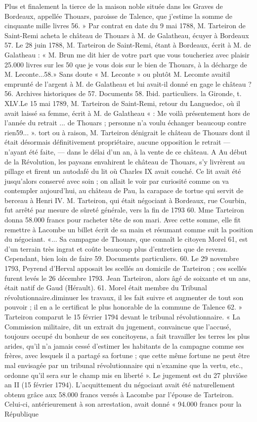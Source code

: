 Plus et finalement la tierce de la maison noble située dans les Graves de Bordeaux, appellée Thouars, paroisse de Talence, que j'estime la somme de cinquante mille livres 56. » Par contrat en date du 9 mai 1788, M. Tarteiron de Saint-Remi acheta le château de Thouars à M. de Galatheau, écuyer à Bordeaux 57. Le 28 juin 1788, M. Tarteiron de Saint-Remi, étant à Bordeaux, écrit à M. de Galatheau : « M. Brun me dit hier de votre part que vous toucheriez avec plaisir 25.000 livres sur les 50 que je vous dois sur le bien de Thouars, à la décharge de M. Leconte...58.» Sans doute « M. Leconte » ou plutôt M. Lecomte avaitil emprunté de l'argent à M. de Galatheau et lui avait-il donné en gage le château ? 56. Archives historiques de 57. Documents 58. Ibid. particuliers. la Gironde, t. XLV.Le 15 mai 1789, M. Tarteiron de Saint-Remi, retour du Languedoc, où il avait laissé sa femme, écrit à M. de Galatheau « : Me voilà présentement hors de l'année du retrait ... de Thouars ; personne n'a voulu échanger beaucoup contre rien59... ». tort ou à raison, M. Tarteiron dénigrait le château de Thouars dont il était désormais définitivement propriétaire, aucune opposition le retrait — n'ayant été faite, — dans le délai d'un an, à la vente de ce château. A Au début de la Révolution, les paysans envahirent le château de Thouars, s'y livrèrent au pillage et firent un autodafé du lit où Charles IX avait couché. Ce lit avait été jusqu'alors conservé avec soin ; on allait le voir par curiosité comme on va contempler aujourd'hui, au château de Pau, la carapace de tortue qui servit de berceau à Henri IV. M. Tarteiron, qui était négociant à Bordeaux, rue Courbin, fut arrêté par mesure de sûreté générale, vers la fin de 1793 60. Mme Tarteiron donna 58.000 francs pour racheter tête de son mari. Avec cette somme, elle fit remettre à Lacombe un billet écrit de sa main et résumant comme suit la position du négociant. «... Sa campagne de Thouars, que connaît le citoyen Morel 61, est d'un terrain très ingrat et coûte beaucoup plus d'entretien que de revenu. Cependant, bien loin de faire 59. Documents particuliers. 60. Le 29 novembre 1793, Peyrend d'Herval apposait les scellés au domicile de Tarteiron ; ces scellés furent levés le 26 décembre 1793. Jean Tarteiron, alors âgé de soixante et un ans, était natif de Gaud (Hérault). 61. Morel était membre du Tribunal révolutionnaire.diminuer les travaux, il les fait suivre et augmenter de tout son pouvoir ; il en a le certificat le plus honorable de la commune de Talence 62. » Tarteiron comparut le 15 février 1794 devant le tribunal révolutionnaire. « La Commission militaire, dit un extrait du jugement, convaincue que l'accusé, toujours occupé du bonheur de ses concitoyens, a fait travailler les terres les plus arides, qu'il n'a jamais cessé d'estimer les habitants de la campagne comme ses frères, avec lesquels il a partagé sa fortune ; que cette même fortune ne peut être mal envisagée par un tribunal révolutionnaire qui n'examine que la vertu, etc., ordonne qu'il sera sur le champ mis en liberté ». Le jugement est du 27 pluviôse an II (15 février 1794). L'acquittement du négociant avait été naturellement obtenu grâce aux 58.000 francs versés à Lacombe par l'épouse de Tarteiron. Celui-ci, antérieurement à son arrestation, avait donné « 94.000 francs pour la République 